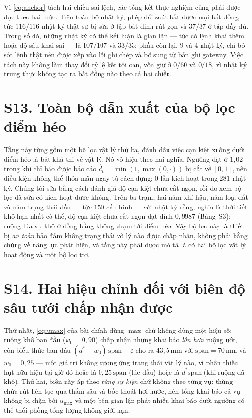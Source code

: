 Vì \eqref{eq:anchor} tách hai chiều sai lệch, các tổng kết thực nghiệm cũng phải được
đọc theo hai mức. Trên toàn bộ nhật ký, phép đối soát bắt được mọi bất đồng, tức
$116/116$ nhật ký thật sự bị sửa ở tập bất định rút gọn và $37/37$ ở tập đầy đủ. Trong
số đó, những nhật ký có thể kết luận là gian lận --- tức có lệnh khai thêm hoặc độ sâu
khai sai --- là $107/107$ và $33/33$; phần còn lại, $9$ và $4$ nhật ký, chỉ bỏ sót lệnh
thật nên được xếp vào lỗi ghi chép và bổ sung từ bản ghi gateway. Việc tách này không
làm thay đổi tỷ lệ kết tội oan, vốn giữ ở $0/60$ và $0/18$, vì nhật ký trung thực không
tạo ra bất đồng nào theo cả hai chiều.

\section*{S13. Toàn bộ dẫn xuất của bộ lọc điểm héo}

Tầng này từng gồm một bộ lọc vật lý thứ ba, đánh dấu việc cạn kiệt xuống dưới điểm héo là
bất khả thi về vật lý. Nó vô hiệu theo hai nghĩa. Ngưỡng đặt ở $1{,}02$ trong khi chỉ báo
được báo cáo $\hat d_t=\min(1,\max(0,\cdot))$ bị cắt về $[0,1]$, nên điều kiện không thể
thỏa mãn ngay từ cách dựng: $0$ lần kích hoạt trong $281$ nhật ký. Chúng tôi sửa bằng cách
đánh giá độ cạn kiệt chưa cắt ngọn, rồi đo xem bộ lọc đã sửa có kích hoạt được không. Trên
ba trạm, hai năm khí hậu, năm loại đất và năm trạng thái đầu --- tức $150$ cấu hình --- với
nhật ký rỗng, nghĩa là thời tiết khô hạn nhất có thể, độ cạn kiệt chưa cắt ngọn đạt đỉnh
$0{,}9987$ (Bảng~S3): ruộng lúa vụ khô ở đồng bằng không chạm tới điểm héo. Vậy bộ lọc này
là thiết bị \emph{an toàn} bảo đảm không trạng thái vô lý nào được chấp nhận, không phải
bằng chứng về năng lực phát hiện, và tầng này phải được mô tả là có hai bộ lọc vật lý hoạt
động và một bộ lọc trơ.

\section*{S14. Hai hiệu chỉnh đối với biên độ sâu tưới chấp nhận được}

Thứ nhất, \eqref{eq:umax} của bài chính dùng $\max$ chứ không dùng một hiệu số: ruộng khô ban
đầu ($w_0=0{,}90$) chấp nhận những khai báo \emph{lớn hơn} ruộng ướt, còn biểu thức ban đầu
$(d^{*}-w_0)\,\mathrm{span}+\varepsilon$ cho ra $43{,}5$\,mm với $\mathrm{span}=70$\,mm và
$w_0=0{,}25$ --- một giá trị không tương ứng trạng thái vật lý nào, vì phần thiếu hụt hữu hiệu
tại giờ đó hoặc là $0{,}25\,\mathrm{span}$ (lúc đầu) hoặc là $d^{*}\mathrm{span}$ (khi ruộng đã
khô). Thứ hai, biên này áp theo \emph{từng sự kiện} chứ không theo từng vụ: thùng chứa rút
liên tục qua thấm sâu và bốc thoát hơi nước, nên tổng khai báo cả vụ không bị chặn bởi
$u_{\max}$ và một bên gian lận phát nhiều khai báo dưới ngưỡng có thể thổi phồng tổng lượng không
giới hạn.

